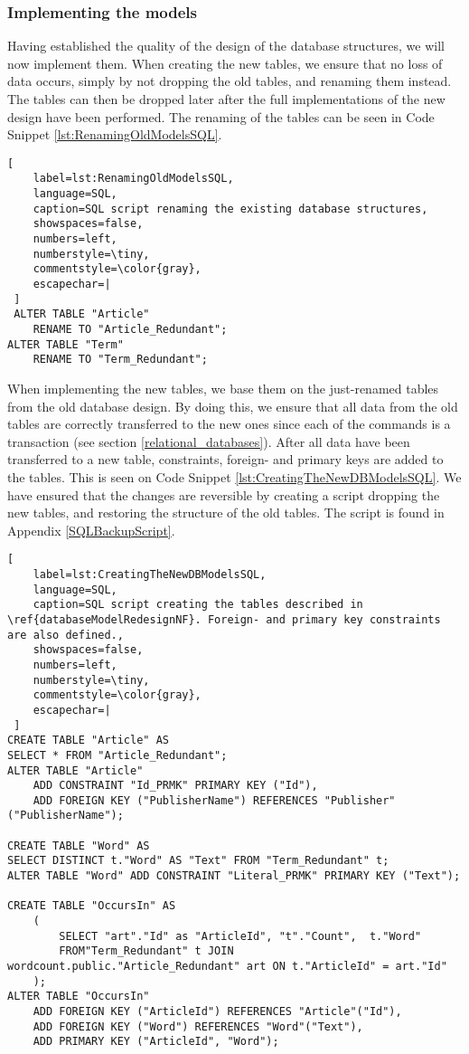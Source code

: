 \subsubsection*{Implementing the models}\label{implementing_new_WC_DB_models}
Having established the quality of the design of the database structures, we will now implement them.
When creating the new tables, we ensure that no loss of data occurs, simply by not dropping the old tables, and renaming them instead. 
The tables can then be dropped later after the full implementations of the new design have been performed.
The renaming of the tables can be seen in Code Snippet \ref{lst:RenamingOldModelsSQL}.

\begin{lstlisting}[
    label=lst:RenamingOldModelsSQL,
    language=SQL,
    caption=SQL script renaming the existing database structures,
    showspaces=false,
    numbers=left,
    numberstyle=\tiny,
    commentstyle=\color{gray},
    escapechar=|
 ]
 ALTER TABLE "Article"
    RENAME TO "Article_Redundant";
ALTER TABLE "Term"
    RENAME TO "Term_Redundant";
\end{lstlisting}

When implementing the new tables, we base them on the just-renamed tables from the old database design.
By doing this, we ensure that all data from the old tables are correctly transferred to the new ones since each of the commands is a transaction (see section \ref{relational_databases}).
After all data have been transferred to a new table, constraints, foreign- and primary keys are added to the tables. 
This is seen on Code Snippet \ref{lst:CreatingTheNewDBModelsSQL}.
We have ensured that the changes are reversible by creating a script dropping the new tables, and restoring the structure of the old tables.
The script is found in Appendix \ref{SQLBackupScript}.

\begin{lstlisting}[
    label=lst:CreatingTheNewDBModelsSQL,
    language=SQL,
    caption=SQL script creating the tables described in \ref{databaseModelRedesignNF}. Foreign- and primary key constraints are also defined.,
    showspaces=false,
    numbers=left,
    numberstyle=\tiny,
    commentstyle=\color{gray},
    escapechar=|
 ]
CREATE TABLE "Article" AS
SELECT * FROM "Article_Redundant";
ALTER TABLE "Article"
    ADD CONSTRAINT "Id_PRMK" PRIMARY KEY ("Id"),
    ADD FOREIGN KEY ("PublisherName") REFERENCES "Publisher"("PublisherName");

CREATE TABLE "Word" AS
SELECT DISTINCT t."Word" AS "Text" FROM "Term_Redundant" t;
ALTER TABLE "Word" ADD CONSTRAINT "Literal_PRMK" PRIMARY KEY ("Text");

CREATE TABLE "OccursIn" AS
    (
        SELECT "art"."Id" as "ArticleId", "t"."Count",  t."Word"
        FROM"Term_Redundant" t JOIN wordcount.public."Article_Redundant" art ON t."ArticleId" = art."Id"
    );
ALTER TABLE "OccursIn"
    ADD FOREIGN KEY ("ArticleId") REFERENCES "Article"("Id"),
    ADD FOREIGN KEY ("Word") REFERENCES "Word"("Text"),
    ADD PRIMARY KEY ("ArticleId", "Word");
\end{lstlisting}

